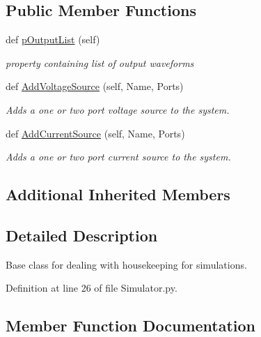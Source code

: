 \subsection*{Public Member Functions}
\begin{DoxyCompactItemize}
\item 
def \hyperlink{classSignalIntegrity_1_1SystemDescriptions_1_1Simulator_1_1Simulator_a4e93b3fc1994f14f72cdcebbf9b68127}{p\+Output\+List} (self)
\begin{DoxyCompactList}\small\item\em property containing list of output waveforms \end{DoxyCompactList}\item 
def \hyperlink{classSignalIntegrity_1_1SystemDescriptions_1_1Simulator_1_1Simulator_ade4e57186554be52881092b572eac2ba}{Add\+Voltage\+Source} (self, Name, Ports)
\begin{DoxyCompactList}\small\item\em Adds a one or two port voltage source to the system. \end{DoxyCompactList}\item 
def \hyperlink{classSignalIntegrity_1_1SystemDescriptions_1_1Simulator_1_1Simulator_a85b87f904dc4ef7e38c80612f8da486a}{Add\+Current\+Source} (self, Name, Ports)
\begin{DoxyCompactList}\small\item\em Adds a one or two port current source to the system. \end{DoxyCompactList}\end{DoxyCompactItemize}
\subsection*{Additional Inherited Members}


\subsection{Detailed Description}
Base class for dealing with housekeeping for simulations. 



Definition at line 26 of file Simulator.\+py.



\subsection{Member Function Documentation}
\mbox{\label{classSignalIntegrity_1_1SystemDescriptions_1_1Simulator_1_1Simulator_a85b87f904dc4ef7e38c80612f8da486a}} 
